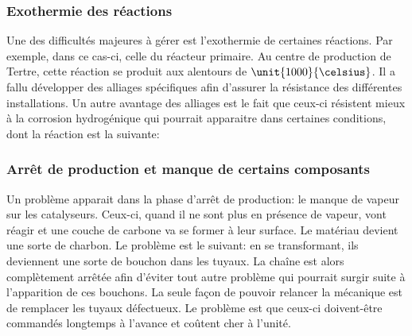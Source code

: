 \subsubsection{Exothermie des réactions}
Une des difficultés majeures à gérer est l'exothermie de certaines réactions. Par exemple, dans ce cas-ci, celle du réacteur primaire. Au centre de production de Tertre, cette réaction se produit aux alentours de $\unit{1000}{\celsius}$. Il a fallu développer des alliages spécifiques afin d'assurer la résistance des différentes installations. Un autre avantage des alliages est le fait que ceux-ci résistent mieux à la corrosion hydrogénique qui pourrait apparaitre dans certaines conditions, dont la réaction est la suivante:


\subsubsection{Arrêt de production et manque de certains composants}
Un problème apparait dans la phase d'arrêt de production: le manque de vapeur sur les catalyseurs. Ceux-ci, quand il ne sont plus en présence de vapeur, vont réagir et une couche de carbone va se former à leur surface. Le matériau devient une sorte de charbon. Le problème est le suivant: en se transformant, ils deviennent une sorte de bouchon dans les tuyaux. La chaîne est alors complètement arrêtée afin d'éviter tout autre problème qui pourrait surgir suite à l'apparition de ces bouchons. La seule façon de pouvoir relancer la mécanique est de remplacer les tuyaux défectueux. Le problème est que ceux-ci doivent-être commandés longtemps à l'avance et coûtent cher à l'unité.

